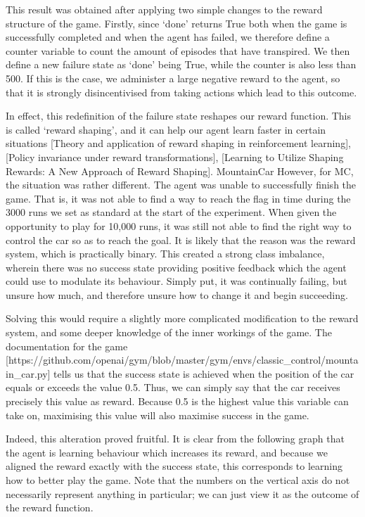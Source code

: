 \documentclass[a4paper]{article}
\begin{document}
This result was obtained after applying two simple changes to the reward structure of the game. Firstly, since `done’ returns True both when the game is successfully completed and when the agent has failed, we therefore define a counter variable to count the amount of episodes that have transpired. We then define a new failure state as `done’ being True, while the counter is also less than 500. If this is the case, we administer a large negative reward to the agent, so that it is strongly disincentivised from taking actions which lead to this outcome.


In effect, this redefinition of the failure state reshapes our reward function. This is called `reward shaping’, and it can help our agent learn faster in certain situations [Theory and application of reward shaping in reinforcement learning], [Policy invariance under reward transformations], [Learning to Utilize Shaping Rewards: A New Approach of Reward Shaping].
MountainCar
However, for MC, the situation was rather different. The agent was unable to successfully finish the game. That is, it was not able to find a way to reach the flag in time during the 3000 runs we set as standard at the start of the experiment. When given the opportunity to play for 10,000 runs, it was still not able to find the right way to control the car so as to reach the goal. It is likely that the reason was the reward system, which is practically binary. This created a strong class imbalance, wherein there was no success state providing positive feedback which the agent could use to modulate its behaviour. Simply put, it was continually failing, but unsure how much, and therefore unsure how to change it and begin succeeding.

Solving this would require a slightly more complicated modification to the reward system, and some deeper knowledge of the inner workings of the game. The documentation for the game [https://github.com/openai/gym/blob/master/gym/envs/classic_control/mountain_car.py] tells us that the success state is achieved when the position of the car equals or exceeds the value 0.5. Thus, we can simply say that the car receives precisely this value as reward. Because 0.5 is the highest value this variable can take on, maximising this value will also maximise success in the game.

Indeed, this alteration proved fruitful. It is clear from the following graph that the agent is learning behaviour which increases its reward, and because we aligned the reward exactly with the success state, this corresponds to learning how to better play the game. Note that the numbers on the vertical axis do not necessarily represent anything in particular; we can just view it as the outcome of the reward function.
\end{document}
